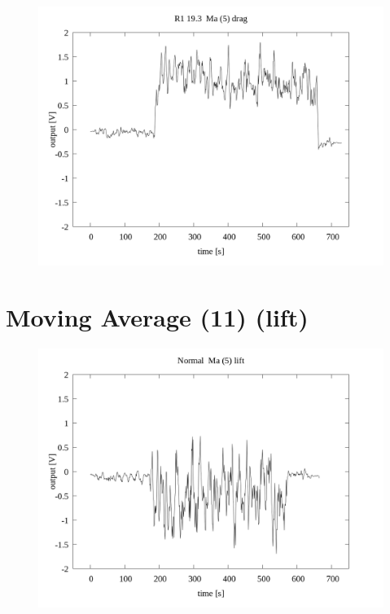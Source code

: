 \documentclass[a4paper]{jsarticle}
\begin{document}
\begin{figure}[htbp]
    \footnotesize
    \begin{center}
        \includegraphics[width=140mm]{../../../../33_result/210806/moving_average/5/drag/01/R1_19.3_ma(5)_drag_01.png}
    \end{center}
\end{figure}

\section{Moving Average (11) (lift)}

\begin{figure}[htbp]
    \footnotesize
    \begin{center}
        \includegraphics[width=140mm]{../../../../33_result/210806/moving_average/5/lift/01/Normal_ma(5)_lift_01.png}
    \end{center}
\end{figure}
\end{document}
